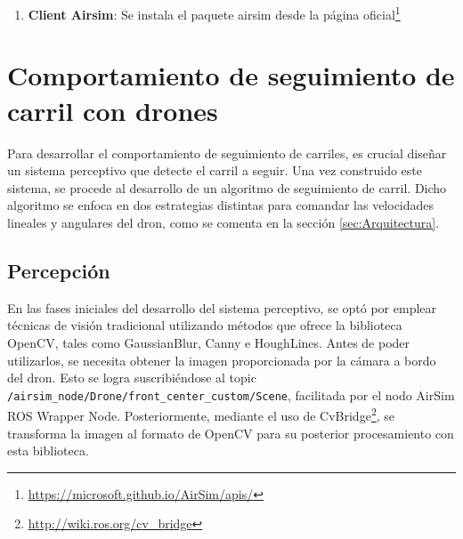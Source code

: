 \begin{enumerate}
     \begin{code}  [H]
      \begin{lstlisting}
        roslaunch airsim_ros_pkgs airsim_node.launch output:=screen host:=192.168.2.16
      \end{lstlisting}
      \caption[comando]{Lanzamiento del nodo AirSim ROS Wrapper Node especificando la dirección IP del simulador}
      \label{cod:roslaunch}
    \end{code} 

    \item \textbf{Client Airsim}: Se instala el paquete airsim desde la página oficial\footnote{\url{https://microsoft.github.io/AirSim/apis/}}

  \end{enumerate}

\section{Comportamiento de seguimiento de carril con drones}
\label{sec:Comportamiento de seguimiento de carril con drones}
Para desarrollar el comportamiento de seguimiento de carriles, es crucial diseñar un sistema perceptivo que detecte el carril a seguir. Una vez 
construido este sistema, se procede al desarrollo de un algoritmo de seguimiento de carril. Dicho algoritmo se enfoca en dos estrategias distintas 
para comandar las velocidades lineales y angulares del dron, como se comenta en la sección \ref{sec:Arquitectura}. 
\subsection{Percepción}
\label{sec:Percepción}

En las fases iniciales del desarrollo del sistema perceptivo, se optó por emplear técnicas de visión tradicional utilizando métodos que ofrece la biblioteca 
OpenCV, tales como GaussianBlur, Canny e HoughLines. Antes de poder utilizarlos, se necesita obtener la imagen proporcionada por la cámara a bordo del dron. Esto se logra
suscribiéndose al topic \texttt{/airsim\_node/Drone/front\_center\_custom/Scene}, facilitada por el nodo AirSim ROS Wrapper Node. Posteriormente, mediante el uso de 
CvBridge\footnote{\url{http://wiki.ros.org/cv_bridge}}, se transforma la imagen al formato de OpenCV para su posterior procesamiento con esta biblioteca. \newline

